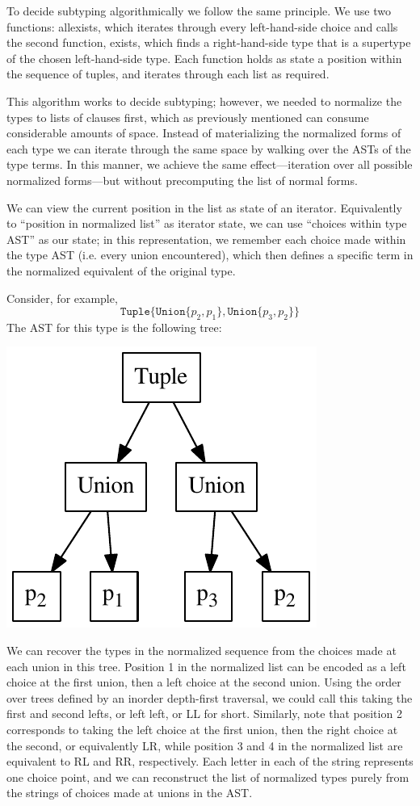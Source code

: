 \documentclass[a4paper,english]{lipics-v2019}
\newcommand{\xt}[1]{\texttt{#1}}
\newcommand{\union}[2]{\xt{Union\{}#1,#2\xt{\}}}
\newcommand{\tuple}[1]{\xt{Tuple\{}#1\xt{\}}}
\begin{document}
To decide subtyping algorithmically we follow the same principle. We
use two functions: allexists, which iterates through every left-hand-side
choice and calls the second function, exists, which finds a right-hand-side
type that is a supertype of the chosen left-hand-side type. Each function
holds as state a position within the sequence of tuples, and iterates through 
each list as required.

This algorithm works to decide subtyping; however, we needed to normalize
the types to lists of clauses first, which as previously mentioned can consume
considerable amounts of space. Instead of materializing the normalized forms
of each type we can iterate through the same space by walking over the
ASTs of the type terms. In this manner, we achieve the same effect---iteration
over all possible normalized forms---but without precomputing the list of normal forms.

We can view the current position in the list as state of an iterator.
Equivalently to ``position in normalized list'' as iterator state,
we can use ``choices within type AST'' as our state; in this representation,
we remember each choice made within the type AST (i.e. every union encountered), 
which then defines a specific term in the normalized equivalent of the original type.

Consider, for example,
\[
 \tuple{ \union{p_2}{p_1}, \union{p_3}{p_2}}
\]
The AST for this type is the following tree:

\includegraphics[scale=0.5]{figures-gen/exmp1.pdf}

We can recover the types in the normalized sequence from the choices made at
each union in this tree. Position 1 in the normalized list can be encoded as a
left choice at the first union, then a left choice at the second union. Using
the order over trees defined by an inorder depth-first traversal, we could
call this taking the first and second lefts, or left left, or LL for short.
Similarly, note that position 2 corresponds to taking the left choice at the
first union, then the right choice at the second, or equivalently LR, while
position 3 and 4 in the normalized list are equivalent to RL and RR,
respectively. Each letter in each of the string represents one choice point,
and we can reconstruct the list of normalized types purely from the strings of
choices made at unions in the AST.
\end{document}
